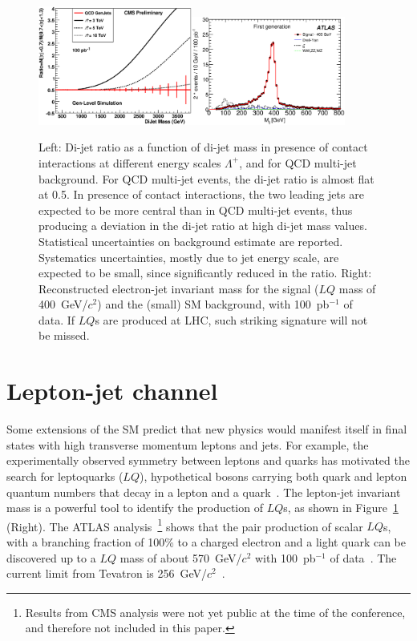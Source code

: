 \documentclass{cimento}
\begin{document}
\begin{figure}[htbp] 
\centering
\includegraphics[width=0.45\textwidth]{DiJetRatio100pbOptFix.eps}\includegraphics[width=0.45\textwidth]{Mejfig5R.eps}  
\caption{Left: Di-jet ratio as a function of di-jet mass in presence of 
contact interactions at different energy scales $\Lambda^{+}$, 
and for QCD multi-jet background. 
For QCD multi-jet events, the di-jet ratio is almost flat at 0.5. 
In presence of contact interactions, the two 
leading jets are expected to be more central than in QCD multi-jet events, 
thus producing a deviation in the di-jet ratio at high di-jet mass values.
Statistical uncertainties on background estimate are reported.  
Systematics uncertainties, mostly due to jet energy scale, are expected to be small, 
since significantly reduced in the ratio.
Right: Reconstructed electron-jet invariant mass for the signal 
($LQ$ mass of 400~GeV/$c^2$) and the (small) SM background, 
with 100~pb$^{-1}$ of data. If $LQ$s are produced at LHC, 
such striking signature will not be missed.}
\label{fig:DiJetRatioAndLQMej}
\end{figure}

\section{Lepton-jet channel} \label{leptonjet}
Some extensions of the SM predict that new physics would manifest itself in 
final states with high transverse momentum leptons and jets.
For example, the experimentally observed symmetry between 
leptons and quarks has motivated the search for leptoquarks ($LQ$), 
hypothetical bosons carrying both quark and lepton quantum numbers 
that decay in a lepton and a quark~\cite{Acosta:1999ws}.
The lepton-jet invariant mass is a powerful tool to identify the production 
of $LQ$s, as shown in Figure~\ref{fig:DiJetRatioAndLQMej} (Right). 
The ATLAS analysis~\footnote{Results from CMS analysis were not yet public at the time 
of the conference, and therefore not included in this paper.} 
shows that the pair production of scalar $LQ$s, with a branching fraction of 100\% 
to a charged electron and a light quark can be discovered up to a $LQ$ 
mass of about 570~GeV/$c^2$ with 100~pb$^{-1}$ of data~\cite{LQATLAS}. 
The current limit from Tevatron is 256~GeV/$c^2$~\cite{Abazov:2004mk}.
\end{document}
